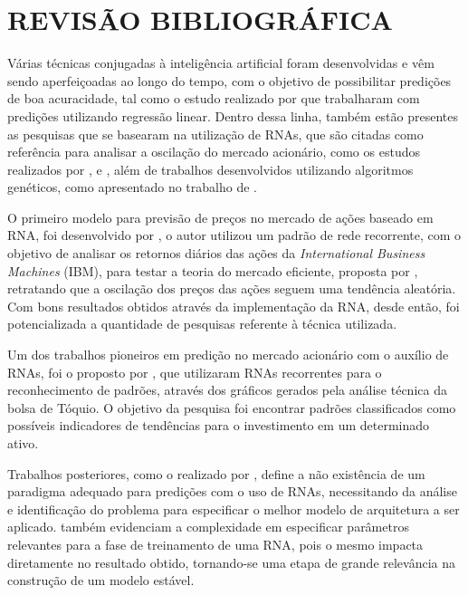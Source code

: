 
\chapter{REVISÃO BIBLIOGRÁFICA}\label{ch:rev-bibs}

Várias técnicas conjugadas à inteligência artificial foram desenvolvidas e vêm sendo aperfeiçoadas ao longo do tempo, com o objetivo de possibilitar predições de boa acuracidade, tal como o estudo realizado por  que trabalharam com predições utilizando regressão linear. Dentro dessa linha, também estão presentes as pesquisas que se basearam na utilização de RNAs, que são citadas como referência para analisar a oscilação do mercado acionário, como os estudos realizados por ,  e , além de trabalhos desenvolvidos utilizando algoritmos genéticos, como apresentado no trabalho de .

O primeiro modelo para previsão de preços no mercado de ações baseado em RNA, foi desenvolvido por , o autor utilizou um padrão de rede recorrente, com o objetivo de analisar os retornos diários das ações da \textit{International Business Machines} (IBM), para testar a teoria do mercado eficiente, proposta por , retratando que a oscilação dos preços das ações seguem uma tendência aleatória. Com bons resultados obtidos através da implementação da RNA, desde então, foi potencializada a quantidade de pesquisas referente à técnica utilizada.

Um dos trabalhos pioneiros em predição no mercado acionário com o auxílio de RNAs, foi o proposto por , que utilizaram RNAs recorrentes para o reconhecimento de padrões, através dos gráficos gerados pela análise técnica da bolsa de Tóquio. O objetivo da pesquisa foi encontrar padrões classificados como possíveis indicadores de tendências para o investimento em um determinado ativo.  

Trabalhos posteriores, como o realizado por , define a não existência de um paradigma adequado para predições com o uso de RNAs, necessitando da análise e identificação do problema para especificar o melhor modelo de arquitetura a ser aplicado.  também evidenciam a complexidade em especificar parâmetros relevantes para a fase de treinamento de uma RNA, pois o mesmo impacta diretamente no resultado obtido, tornando-se uma etapa de grande relevância na construção de um modelo estável.

